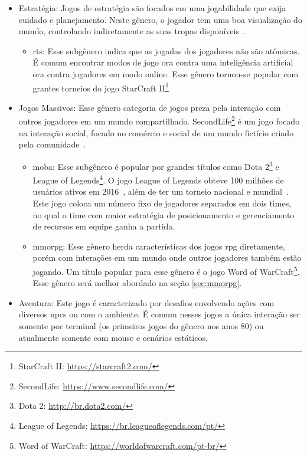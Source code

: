 \begin{itemize}
  \item Estratégia: Jogos de estratégia são focados em uma jogabilidade que exija cuidado e planejamento. Neste gênero, o jogador tem uma boa visualização do mundo, controlando indiretamente as suas tropas disponíveis~\cite{rollings2003andrew}.
    \begin{itemize}
      \item \ac{rts}: Esse subgênero indica que as jogadas dos jogadores não são atômicas. É comum encontrar modos de jogo ora contra uma inteligência artificial ora contra jogadores em modo online. Esse gênero tornou-se popular com grantes torneios do jogo StarCraft II\footnote{StarCraft II: \url{https://starcraft2.com/}}
    \end{itemize}
  \item Jogos Massivos: Esse gênero categoria de jogos preza pela interação com outros jogadores em um mundo compartilhado. SecondLife\footnote{SecondLife: \url{https://www.secondlife.com/}} é um jogo focado na interação social, focado no comércio e social de um mundo fictício criado pela comunidade~\cite{tecmundo_secondlife}.
    \begin{itemize}
      \item \ac{moba}: Esse subgênero é popular por grandes títulos como Dota 2\footnote{Dota 2: \url{http://br.dota2.com/}} e League of Legends\footnote{League of Legends: \url{https://br.leagueoflegends.com/pt/}}. O jogo League of Legends obteve 100 milhões de usuários ativos em 2016~\cite{lol_statista}, além de ter um torneio nacional e mundial~\cite{lol_sportv}. Este jogo coloca um número fixo de jogadores separados em dois times, no qual o time com maior estratégia de posicionamento e gerenciamento de recursos em equipe ganha a partida.
      \item \ac{mmorpg}: Esse gênero herda características dos jogos \ac{rpg} diretamente, porém com interações em um mundo onde outros jogadores também estão jogando. Um título popular para esse gênero é o jogo Word of WarCraft\footnote{Word of WarCraft: \url{https://worldofwarcraft.com/pt-br/}}. Esse gênero será melhor abordado na seção \ref{sec:mmorpg}.
    \end{itemize}
  \item Aventura: Este jogo é caracterizado por desafios envolvendo ações com diversos \ac{npcs} ou com o ambiente. É comum nesses jogos a única interação ser somente por terminal (os primeiros jogos do gênero nos anos 80) ou atualmente somente com mouse e cenários estáticos.

\end{itemize}
